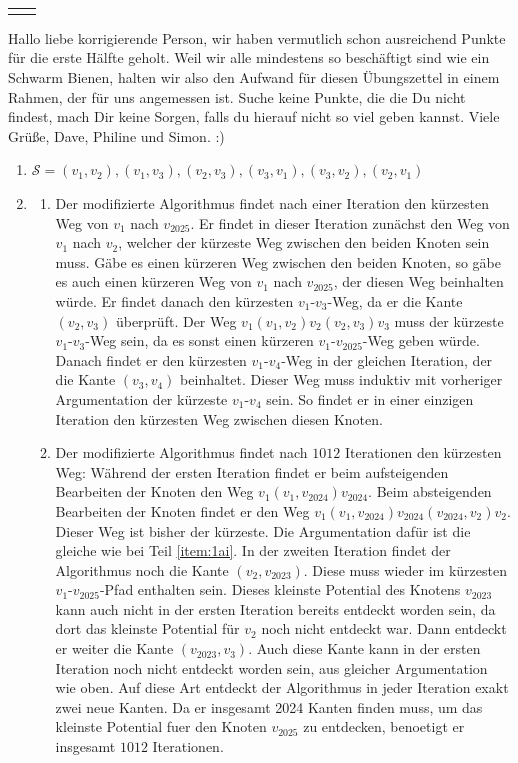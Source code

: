 \documentclass{scrartcl} %
\makeatletter
\newcommand{\headvorlage}{	
	\group{24} \hfill \textbf{\semester} \\
	\begin{tabular}{@{}l r}
		\student{Philine Stella Bock}{507316}
		\student{Devagya Sharma}{495395}
		\student{Simon Seemüller}{513084}
	\end{tabular}
	\haloesung{04}
}
\makeatother
\begin{document}
    \setcounter{auf}{0}
	\headvorlage
    Hallo liebe korrigierende Person, wir haben vermutlich schon ausreichend Punkte für die erste Hälfte geholt. Weil wir alle mindestens so beschäftigt sind wie ein Schwarm Bienen, halten wir also den Aufwand für diesen Übungszettel in einem Rahmen, der für uns angemessen ist. Suche keine Punkte, die die Du nicht findest, mach Dir keine Sorgen, falls du hierauf nicht so viel geben kannst. Viele Grüße, Dave, Philine und Simon. :)
    
    \begin{aufgabe}
        \begin{enumerate}[label=(\alph*)]
            \item $\mathcal{S} = (v_1, v_2), (v_1, v_3), (v_2, v_3), (v_3, v_1), (v_3, v_2), (v_2, v_1)$
            \item \begin{enumerate}[label=(\roman*)]
                \item \label{item:1ai} Der modifizierte Algorithmus findet nach einer Iteration den kürzesten Weg von $v_1$ nach $v_{2025}$. Er findet in dieser Iteration zunächst den Weg von $v_1$ nach $v_2$, welcher der kürzeste Weg zwischen den beiden Knoten sein muss. Gäbe es einen kürzeren Weg zwischen den beiden Knoten, so gäbe es auch einen kürzeren Weg von $v_1$ nach $v_{2025}$, der diesen Weg beinhalten würde. Er findet danach den kürzesten $v_1$-$v_3$-Weg, da er die Kante $(v_2, v_3)$ überprüft. Der Weg $v_1(v_1, v_2)v_2(v_2, v_3)v_3$ muss der kürzeste $v_1$-$v_3$-Weg sein, da es sonst einen kürzeren $v_1$-$v_{2025}$-Weg geben würde. Danach findet er den kürzesten $v_1$-$v_4$-Weg in der gleichen Iteration, der die Kante $(v_3, v_4)$ beinhaltet. Dieser Weg muss induktiv mit vorheriger Argumentation der kürzeste $v_1$-$v_4$ sein. So findet er in einer einzigen Iteration den kürzesten Weg zwischen diesen Knoten.
                \item Der modifizierte Algorithmus findet nach $1012$ Iterationen den kürzesten Weg: Während der ersten Iteration findet er beim aufsteigenden Bearbeiten der Knoten den Weg $v_1(v_1, v_{2024})v_{2024}$. Beim absteigenden Bearbeiten der Knoten findet er den Weg $v_1(v_1, v_{2024})v_{2024}(v_{2024}, v_2)v_2$. Dieser Weg ist bisher der kürzeste. Die Argumentation dafür ist die gleiche wie bei Teil \ref{item:1ai}. In der zweiten Iteration findet der Algorithmus noch die Kante $(v_2, v_{2023})$. Diese muss wieder im kürzesten $v_1$-$v_2025$-Pfad enthalten sein. Dieses kleinste Potential des Knotens $v_{2023}$ kann auch nicht in der ersten Iteration bereits entdeckt worden sein, da dort das kleinste Potential für $v_2$ noch nicht entdeckt war. Dann entdeckt er weiter die Kante $(v_{2023}, v_3)$. Auch diese Kante kann in der ersten Iteration noch nicht entdeckt worden sein, aus gleicher Argumentation wie oben. Auf diese Art entdeckt der Algorithmus in jeder Iteration exakt zwei neue Kanten. Da er insgesamt 2024 Kanten finden muss, um das kleinste Potential fuer den Knoten $v_{2025}$ zu entdecken, benoetigt er insgesamt $1012$ Iterationen.                

\end{enumerate}
\end{enumerate}
\end{aufgabe}
\end{document}
